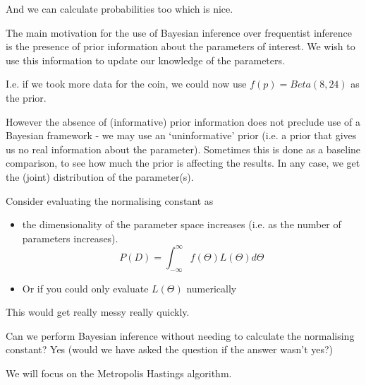 \documentclass{/home/janmebows/Documents/LatexTemplates/myassignment}
\begin{document}
And we can calculate probabilities too which is nice.


The main motivation for the use of Bayesian inference over frequentist inference is the presence of prior information about the parameters of interest. We wish to use this information to update our knowledge of the parameters.

I.e. if we took more data for the coin, we could now use $f(p)= Beta(8,24)$ as the prior.

However the absence of (informative) prior information does not preclude use of a Bayesian framework - we may use an `uninformative' prior (i.e. a prior that gives us no real information about the parameter). Sometimes this is done as a baseline comparison, to see how much the prior is affecting the results. In any case, we get the (joint) distribution of the parameter(s).

Consider evaluating the normalising constant as
\begin{itemize}
    \item the dimensionality of the parameter space increases (i.e. as the number of parameters increases).
\[P(D) = \int_{-\infty}^{\infty} f(\Theta) L(\Theta) d\Theta\]
    \item Or if you could only evaluate $L(\Theta)$ numerically
\end{itemize}
This would get really messy really quickly.

Can we perform Bayesian inference without needing to calculate the normalising constant? Yes (would we have asked the question if the answer wasn't yes?)

We will focus on the Metropolis Hastings algorithm.
\end{document}
